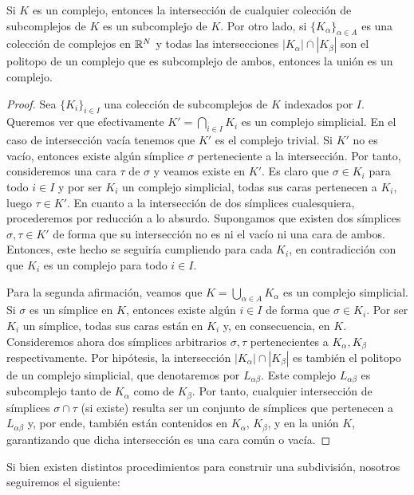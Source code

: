 \begin{lema}
	\label{lem:compl-cons}
	Si $K$ es un complejo, entonces la intersección de cualquier colección de subcomplejos de $K$ es un subcomplejo de $K$. Por otro lado, si $\{K_{\alpha}\}_{\alpha \in A}$ es una colección de complejos en $\mathbb{R}^N$ y todas las intersecciones $|K_{\alpha}| \cap |K_{\beta}|$ son el politopo de un complejo que es subcomplejo de ambos, entonces la unión es un complejo.
\end{lema}
\begin{proof}
	Sea $\{K_i\}_{i \in I}$ una colección de subcomplejos de $K$ indexados por $I$. Queremos ver que efectivamente $K' = \bigcap_{i \in I} K_i$ es un complejo simplicial. En el caso de intersección vacía tenemos que $K'$ es el complejo trivial. Si $K'$ no es vacío, entonces existe algún símplice $\sigma$ perteneciente a la intersección. Por tanto, consideremos una cara $\tau$ de $\sigma$ y veamos existe en $K'$. Es claro que $\sigma \in K_i$ para todo $i \in I$ y por ser $K_i$ un complejo simplicial, todas sus caras pertenecen a $K_i$, luego $\tau \in K'$. En cuanto a la intersección de dos símplices cualesquiera, procederemos por reducción a lo absurdo. Supongamos que existen dos símplices $\sigma, \tau \in K'$ de forma que su intersección no es ni el vacío ni una cara de ambos. Entonces, este hecho se seguiría cumpliendo para cada $K_i$, en contradicción con que $K_i$ es un complejo para todo $i \in I$.

	Para la segunda afirmación, veamos que $K = \bigcup_{\alpha \in A} K_\alpha$ es un complejo simplicial. Si $\sigma$ es un símplice en $K$, entonces existe algún $i \in I$ de forma que $\sigma \in K_i$. Por ser $K_i$ un símplice, todas sus caras están en $K_i$ y, en consecuencia, en $K$. Consideremos ahora dos símplices arbitrarios \(\sigma, \tau\) pertenecientes a \(K_{\alpha}, K_{\beta}\) respectivamente. Por hipótesis, la intersección  \(|K_\alpha| \cap |K_\beta|\) es también el politopo de un complejo simplicial, que denotaremos por \(L_{\alpha \beta}\). Este complejo \(L_{\alpha \beta}\) es subcomplejo tanto de \(K_\alpha\) como de \(K_\beta\). Por tanto, cualquier intersección de símplices \(\sigma \cap \tau\) (si existe) resulta ser un conjunto de símplices que pertenecen a \(L_{\alpha \beta}\) y, por ende, también están contenidos en \(K_{\alpha}\), \(K_{\beta}\), y en la unión \(K\), garantizando que dicha intersección es una cara común o vacía.
\end{proof}

Si bien existen distintos procedimientos para construir una subdivisión, nosotros seguiremos el siguiente:

